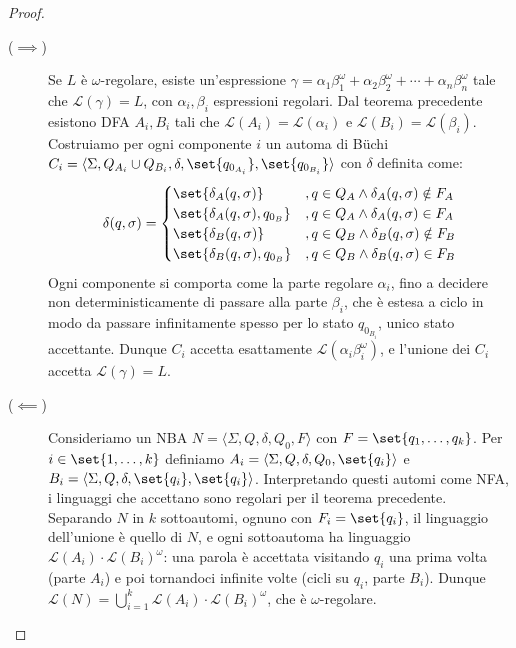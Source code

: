 \begin{proof}
  \begin{description}
    \item[(\(\implies\))] Se \(L\) è \(\omega\)-regolare, esiste un'espressione \(\gamma = \alpha_1\beta_1^\omega+\alpha_2\beta_2^\omega+\cdots + \alpha_n\beta_n^\omega\) tale che \(\mathcal{L}(\gamma) = L\), con \(\alpha_i,\beta_i\) espressioni regolari. Dal teorema precedente esistono DFA \(A_{i}, B_{i}\) tali che \(\mathcal{L}(A_i) = \mathcal{L}(\alpha_i)\) e \(\mathcal{L}(B_i) = \mathcal{L}(\beta_i)\).
          Costruiamo per ogni componente \(i\) un automa di Büchi \(C_i= \langle \Sigma, Q_{A_i} \cup Q_{B_i}, \delta, \set{q_{0_{A_i}}}, \set{q_{0_{B_i}}}\rangle\) con \(\delta\) definita come:
          \[\delta(q,\sigma)=\begin{cases}
              \set{\delta_A(q,\sigma)}          & ,q \in Q_A \land \delta_A(q,\sigma)\notin F_A \\
              \set{\delta_A(q,\sigma), q_{0_B}} & ,q \in Q_A \land \delta_A(q,\sigma)\in F_A    \\
              \set{\delta_B(q,\sigma)}          & ,q \in Q_B \land \delta_B(q,\sigma)\notin F_B \\
              \set{\delta_B(q,\sigma), q_{0_B}} & ,q \in Q_B \land \delta_B(q,\sigma)\in F_B    \\
            \end{cases}\]
          Ogni componente si comporta come la parte regolare \(\alpha_i\), fino a decidere non deterministicamente di passare alla parte \(\beta_i\), che è estesa a ciclo in modo da passare infinitamente spesso per lo stato \(q_{0_{B_i}}\), unico stato accettante. Dunque \(C_i\) accetta esattamente \(\mathcal{L}(\alpha_i\beta_i^\omega)\), e l'unione dei \(C_i\) accetta \(\mathcal{L}(\gamma) = L\).
    \item[(\(\impliedby\))] Consideriamo un NBA \(N = \langle \Sigma, Q, \delta, Q_0, F\rangle\) con \(F = \set{q_1,\ldots,q_k}\). Per \(i \in \set{1,\ldots,k}\) definiamo \(A_i = \langle \Sigma, Q, \delta, Q_0, \set{q_i}\rangle\) e \(B_i = \langle \Sigma, Q, \delta, \set{q_i}, \set{q_i}\rangle\). Interpretando questi automi come NFA, i linguaggi che accettano sono regolari per il teorema precedente. Separando \(N\) in \(k\) sottoautomi, ognuno con \(F_i = \set{q_i}\), il linguaggio dell'unione è quello di \(N\), e ogni sottoautoma ha linguaggio \(\mathcal{L}(A_i)\cdot {\mathcal{L}(B_i)}^\omega\): una parola è accettata visitando \(q_i\) una prima volta (parte \(A_i\)) e poi tornandoci infinite volte (cicli su \(q_i\), parte \(B_i\)). Dunque \(\mathcal{L}(N) = \bigcup_{i=1}^k \mathcal{L}(A_i)\cdot {\mathcal{L}(B_i)}^\omega\), che è \(\omega\)-regolare.
  \end{description}
\end{proof}


